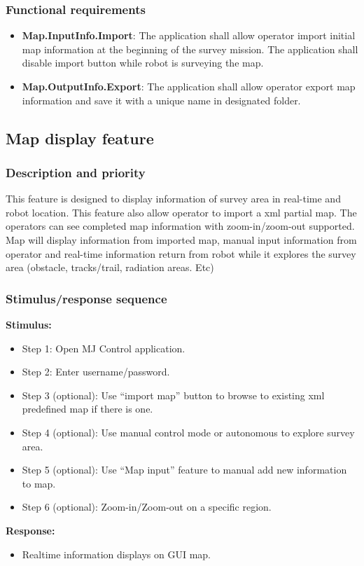 \documentclass[10pt,a4paper,titlepage]{article}
\begin{document}
	\subsubsection{Functional requirements}
	\begin{itemize}
		\item \textbf{Map.InputInfo.Import}: The application shall allow operator import initial map information at the beginning of the survey mission. The application shall disable import button while robot is surveying the map.
		\item \textbf{Map.OutputInfo.Export}: The application shall allow operator export map information and save it with a unique name in designated folder.
	\end{itemize}
	
	\subsection{Map display feature}
	\subsubsection{Description and priority}
	\text This feature is designed to display information of survey area in real-time and robot location. This feature also allow operator to import a xml partial map. The operators can see completed map information with zoom-in/zoom-out supported. Map will display information from imported map, manual input information from operator and real-time information return from robot while it explores the survey area (obstacle, tracks/trail, radiation areas. Etc)
	\subsubsection{Stimulus/response sequence}
	\textbf{Stimulus:}
	\begin{itemize}
	
		\item Step 1: Open MJ Control application.
		\item Step 2: Enter username/password.
		\item Step 3 (optional): Use “import map” button to browse to existing xml predefined map if there is one.
		\item Step 4 (optional): Use manual control mode or autonomous to explore survey area.
		\item Step 5 (optional): Use “Map input” feature to manual add new information to map.
		\item Step 6 (optional): Zoom-in/Zoom-out on a specific region.
		
	\end{itemize}
	\textbf{Response:}
	\begin{itemize}
		\item Realtime information displays on GUI map.
	\end{itemize}
\end{document}
